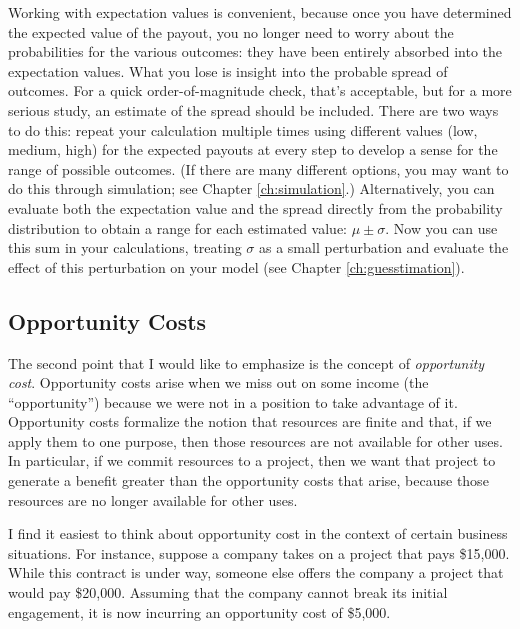 Working with expectation values is convenient, because once you have
determined the expected value of the payout, you no longer need to
worry about the probabilities for the various outcomes: they have been
entirely absorbed into the expectation values. What you lose is
insight into the probable spread of outcomes. For a quick
order-of-magnitude check, that's acceptable, but for a more serious
study, an estimate of the spread should be included.  There are two
ways to do this: repeat your calculation multiple times using
different values (low, medium, high) for the expected payouts at every
step to develop a sense for the range of possible outcomes. (If there
are many different options, you may want to do this through
simulation; see\vadjust{\pagebreak} Chapter \ref{ch:simulation}.) Alternatively, you can
evaluate both the expectation value and the spread directly from the
probability distribution to obtain a range for each estimated value:
$\mu \pm \sigma$.  Now you can use this sum in your calculations,
treating $\sigma$ as a small perturbation and evaluate the effect of
this perturbation on your model (see Chapter \ref{ch:guesstimation}).


\vspace*{-6pt}
\subsection{Opportunity Costs}

   
The second point that I would like to emphasize is the concept of
\emph{opportunity cost}. Opportunity costs arise when we miss out on
some income (the ``opportunity'') because we were not in a position to
take advantage of it. Opportunity costs formalize the notion that
resources are finite and that, if we apply them to one purpose, then
those resources are not available for other uses. In particular, if we
commit resources to a project, then we want that project to generate a
benefit greater than the opportunity costs that arise, because those
resources are no longer available for other uses.
    
I find it easiest to think about opportunity cost in the context of
certain business situations.  For instance, suppose a company takes on
a project that pays \$15,000.  While this contract is under way,
someone else offers the company a project that would pay
\$20,000. Assuming that the company cannot break its initial
engagement, it is now incurring an opportunity cost of \$5,000.
    

